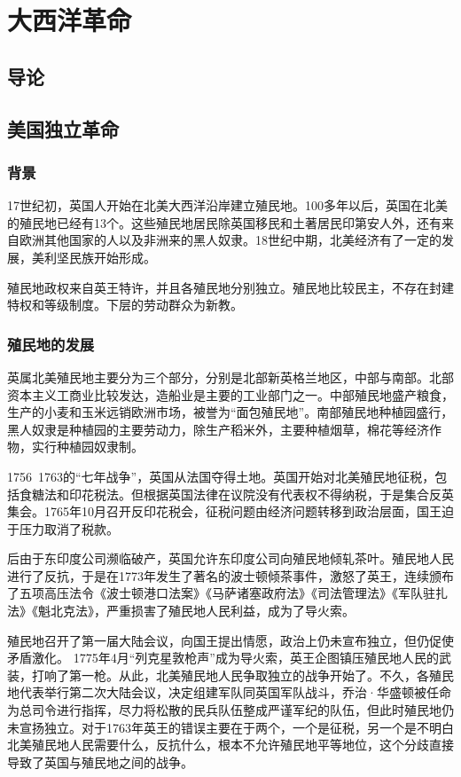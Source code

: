 \section{大西洋革命}

\subsection{导论}

\subsection{美国独立革命}

\subsubsection{背景}
17世纪初，英国人开始在北美大西洋沿岸建立殖民地。100多年以后，英国在北美的殖民地已经有13个。这些殖民地居民除英国移民和土著居民印第安人外，还有来自欧洲其他国家的人以及非洲来的黑人奴隶。18世纪中期，北美经济有了一定的发展，美利坚民族开始形成。

殖民地政权来自英王特许，并且各殖民地分别独立。殖民地比较民主，不存在封建特权和等级制度。下层的劳动群众为新教。

\subsubsection{殖民地的发展}
英属北美殖民地主要分为三个部分，分别是北部新英格兰地区，中部与南部。北部资本主义工商业比较发达，造船业是主要的工业部门之一。中部殖民地盛产粮食，生产的小麦和玉米远销欧洲市场，被誉为“面包殖民地”。南部殖民地种植园盛行，黑人奴隶是种植园的主要劳动力，除生产稻米外，主要种植烟草，棉花等经济作物，实行种植园奴隶制。

1756~1763的“七年战争”，英国从法国夺得土地。英国开始对北美殖民地征税，包括食糖法和印花税法。但根据英国法律在议院没有代表权不得纳税，于是集合反英集会。1765年10月召开反印花税会，征税问题由经济问题转移到政治层面，国王迫于压力取消了税款。

后由于东印度公司濒临破产，英国允许东印度公司向殖民地倾轧茶叶。殖民地人民进行了反抗，于是在1773年发生了著名的波士顿倾茶事件，激怒了英王，连续颁布了五项高压法令《波士顿港口法案》《马萨诸塞政府法》《司法管理法》《军队驻扎法》《魁北克法》，严重损害了殖民地人民利益，成为了导火索。

殖民地召开了第一届大陆会议，向国王提出情愿，政治上仍未宣布独立，但仍促使矛盾激化。
1775年4月“列克星敦枪声”成为导火索，英王企图镇压殖民地人民的武装，打响了第一枪。从此，北美殖民地人民争取独立的战争开始了。不久，各殖民地代表举行第二次大陆会议，决定组建军队同英国军队战斗，乔治·华盛顿被任命为总司令进行指挥，尽力将松散的民兵队伍整成严谨军纪的队伍，但此时殖民地仍未宣扬独立。对于1763年英王的错误主要在于两个，一个是征税，另一个是不明白北美殖民地人民需要什么，反抗什么，根本不允许殖民地平等地位，这个分歧直接导致了英国与殖民地之间的战争。

